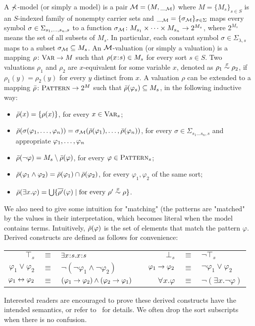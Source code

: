 A $\mathbb{\Sigma}$-model (or simply a model) is a pair
$\mathcal{M} = (M, \__{\mathcal{M}})$ 
where $M = \{M_s\}_{s \in S}$ 
is an $S$-indexed family of nonempty carrier sets
and $\__{\mathcal{M}} = \{ {\sigma_{\mathcal{M}}} \}_{\sigma \in \Sigma}$
maps every symbol $\sigma \in \Sigma_{s_1 ,\dots, s_n , s}$
to a function
${\sigma_{\mathcal{M}}} \colon M_{s_1} \times \dots \times M_{s_n} \to 2^{M_s}$,
where $2^{M_s}$ means the set of all subsets of $M_s$.
In particular, each constant symbol
$\sigma \in \Sigma_{\lambda,s}$ 
maps to a subset ${\sigma_{\mathcal{M}}} \subseteq M_s$.
An $\mathcal{M}$-valuation (or simply a valuation) is a mapping
$\rho \colon \textsc{Var} \to M$
such that $\rho(x \mathbin{\!:\!} s) \in M_s$ for every sort $s \in S$.
Two valuations $\rho_1$ and $\rho_2$ are $x$-equivalent for some variable $x$,
denoted as $\rho_1 \overset{x}{\sim} \rho_2$,
if $\rho_1(y) = \rho_2(y)$ for every $y$ distinct from $x$.
A valuation $\rho$ can be extended to a mapping
$\bar{\rho} \colon \textsc{Pattern} \to 2^{M}$
such that $\bar{\rho}(\varphi_s) \subseteq M_s$,
in the following inductive way:
\begin{itemize}
\item $\bar{\rho}(x) = \{ \rho(x) \}$, for every $x \in \textsc{Var}_s$;
\item $\bar{\rho}(\sigma(\varphi_1 ,\dots, \varphi_n))
       = {\sigma_{\mathcal{M}}}( \bar{\rho}(\varphi_1) ,\dots, \bar{\rho}(\varphi_n) )$,
      for every $\sigma \in \Sigma_{s_1 \dots s_n , s}$
      and appropriate $\varphi_1 ,\dots, \varphi_n$
\item $\bar{\rho}(\neg \varphi) = M_s \setminus \bar{\rho}(\varphi)$,
      for every $\varphi \in \textsc{Pattern}_s$;
\item $\bar{\rho}(\varphi_1 \wedge \varphi_2)
       = \bar{\rho}(\varphi_1) \cap \bar{\rho}(\varphi_2)$,
      for every $\varphi_1,\varphi_2$ of the same sort;
\item $\bar{\rho}(\exists x . \varphi) 
       = \bigcup \{ \overline{\rho'}(\varphi) 
                    \mid \text{for every $\rho' \overset{x}{\sim} \rho$} \}$.
\end{itemize}
{
We also need to give some intuition for "matching" 
(the patterns are "matched" 
by the values in their interpretation, 
which becomes literal when the model contains terms.
}
Intuitively,
$\bar{\rho}(\varphi)$ 
is the set of elements that match the pattern $\varphi$.
Derived constructs are defined as follows for convenience:
\begin{center}
\begin{tabular}{rclp{1cm}rcl}
$\top_s$ & $\equiv$ & $\exists x \mathbin{\!:\!} s . x \mathbin{\!:\!} s$
&&
$\bot_s$ & $\equiv$ & $\neg \top_s$
\\
$\varphi_1 \vee \varphi_2$ & $\equiv$ & 
$\neg (\neg \varphi_1 \wedge \neg \varphi_2)$
&&
$\varphi_1 \to \varphi_2$ & $\equiv$ &
$\neg \varphi_1 \vee \varphi_2$
\\
$\varphi_1 \leftrightarrow \varphi_2$ & $\equiv$ &
$(\varphi_1 \to \varphi_2) \wedge (\varphi_2 \to \varphi_1)$
&&
$\forall x . \varphi$ & $\equiv$ &
$\neg (\exists x . \neg \varphi)$
\end{tabular}
\end{center}
Interested readers are encouraged to prove these derived constructs
have the intended semantics,
or refer to~\cite{bibid} for details.
We often drop the sort subscripts when there is no confusion.

